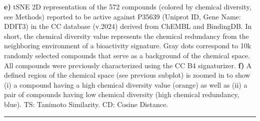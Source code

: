 \begin{Figure_modified}
{    \textbf{e)} tSNE 2D representation of the 572 compounds (colored by chemical diversity, see Methods) reported to be active against P35639 (Uniprot ID, Gene Name: DDIT3) in the CC database (v.2024) derived from ChEMBL and BindingDB. In short, the chemical diversity value represents the chemical redundancy from the neighboring environment of a bioactivity signature. Gray dots correspond to 10k randomly selected compounds that serve as a background of the chemical space. All compounds were previously characterized using the CC B4 signaturizer\cite{bertoni_bioactivity_2021}.
    \textbf{f)} A defined region of the chemical space (see previous subplot) is zoomed in to show (i) a compound having a high chemical diversity value (orange) as well as (ii) a pair of compounds having low chemical diversity (high chemical redundancy, blue). TS: Tanimoto Similarity. CD: Cosine Distance. 
}
  \vspace{-5mm}
  \rule[0ex]{\textwidth}{0.5pt}
  \vspace{-9mm}
  \label{Navigation_Fig3}
\end{Figure_modified}